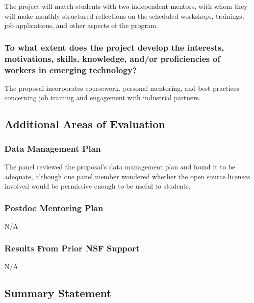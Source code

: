 The project will match students with two independent mentors, with whom they will make monthly structured reflections on the scheduled workshops, trainings, job applications, and other aspects of the program.

\subsubsection{To what extent does the project develop the interests, motivations, skills, knowledge, and/or proficiencies of workers in emerging technology?}

The proposal incorporates coursework, personal mentoring, and best practices concerning job training and engagement with industrial partners.

\subsection{Additional Areas of Evaluation} 

\subsubsection{Data Management Plan}

The panel reviewed the proposal’s data management plan and found it to be adequate, although one panel member wondered whether the open source licenses involved would be permissive enough to be useful to students.

\subsubsection{Postdoc Mentoring Plan}

N/A

\subsubsection{Results From Prior NSF Support}

N/A

\subsection{Summary Statement}

